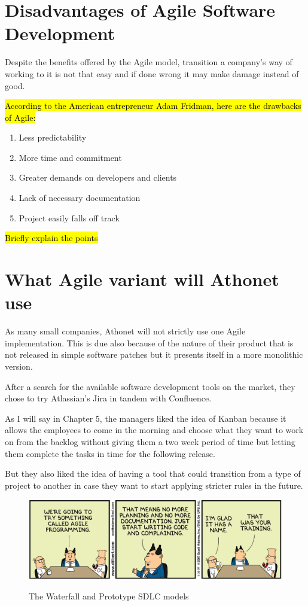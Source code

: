 \section{Disadvantages of Agile Software Development}
	
	Despite the benefits offered by the Agile model, transition a company's way of working to it is not that easy and if done wrong it may make damage instead of good.

	\hl{According to the American entrepreneur Adam Fridman, here are the drawbacks of Agile:}
	\begin{enumerate}
		\item Less predictability
		\item More time and commitment
		\item Greater demands on developers and clients
		\item Lack of necessary documentation
		\item Project easily falls off track
	\end{enumerate}
	\hl{Briefly explain the points}
	
\section{What Agile variant will Athonet use}

	As many small companies, Athonet will not strictly use one Agile implementation.
	This is due also because of the nature of their product that is not released in simple software patches but it presents itself in a more monolithic version.
	
	After a search for the available software development tools on the market, they chose to try Atlassian's Jira in tandem with Confluence.
	
	As I will say in Chapter 5, the managers liked the idea of Kanban because it allows the employees to come in the morning and choose what they want to work on from the backlog without giving them a two week period of time but letting them complete the tasks in time for the following release.
	
	But they also liked the idea of having a tool that could transition from a type of project to another in case they want to start applying stricter rules in the future.
	
	\begin{figure}[H]
		\centering
		\includegraphics[width=\textwidth]{resources/Dilbert_Training_Agile_Programming}\\
		\caption{The Waterfall and Prototype SDLC models}
	\end{figure}

